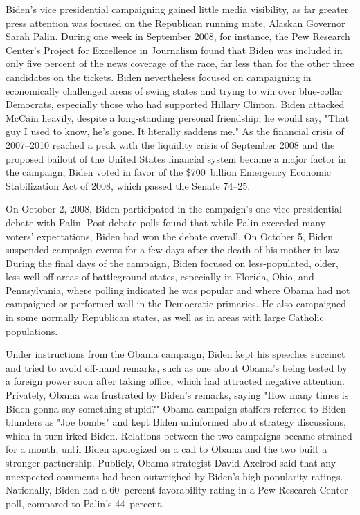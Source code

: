Biden's vice presidential campaigning gained little media visibility, as
far greater press attention was focused on the Republican running mate,
Alaskan Governor Sarah Palin. During one week in September 2008, for
instance, the Pew Research Center's Project for Excellence in Journalism
found that Biden was included in only five percent of the news coverage
of the race, far less than for the other three candidates on the
tickets. Biden nevertheless focused on campaigning in economically
challenged areas of swing states and trying to win over blue-collar
Democrats, especially those who had supported Hillary Clinton. Biden
attacked McCain heavily, despite a long-standing personal friendship; he
would say, "That guy I used to know, he's gone. It literally saddens
me." As the financial crisis of 2007--2010 reached a peak with the
liquidity crisis of September 2008 and the proposed bailout of the
United States financial system became a major factor in the campaign,
Biden voted in favor of the \$700~billion Emergency Economic
Stabilization Act of 2008, which passed the Senate 74--25.

On October 2, 2008, Biden participated in the campaign's one vice
presidential debate with Palin. Post-debate polls found that while Palin
exceeded many voters' expectations, Biden had won the debate overall. On
October 5, Biden suspended campaign events for a few days after the
death of his mother-in-law. During the final days of the campaign, Biden
focused on less-populated, older, less well-off areas of battleground
states, especially in Florida, Ohio, and Pennsylvania, where polling
indicated he was popular and where Obama had not campaigned or performed
well in the Democratic primaries. He also campaigned in some normally
Republican states, as well as in areas with large Catholic populations.

Under instructions from the Obama campaign, Biden kept his speeches
succinct and tried to avoid off-hand remarks, such as one about Obama's
being tested by a foreign power soon after taking office, which had
attracted negative attention. Privately, Obama was frustrated by Biden's
remarks, saying "How many times is Biden gonna say something stupid?"
Obama campaign staffers referred to Biden blunders as "Joe bombs" and
kept Biden uninformed about strategy discussions, which in turn irked
Biden. Relations between the two campaigns became strained for a month,
until Biden apologized on a call to Obama and the two built a stronger
partnership. Publicly, Obama strategist David Axelrod said that any
unexpected comments had been outweighed by Biden's high popularity
ratings. Nationally, Biden had a 60~percent favorability rating in a Pew
Research Center poll, compared to Palin's 44~percent.

